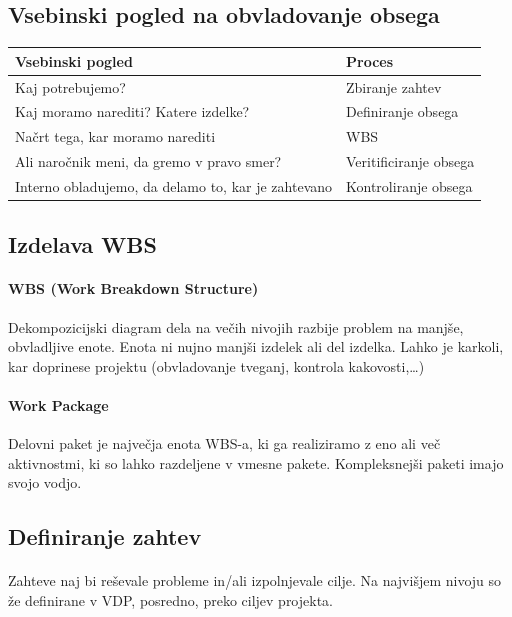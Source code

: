\documentclass[a4paper,12pt]{report}
\begin{document}
      \subsection{Vsebinski pogled na obvladovanje obsega}
         \begin{center}
            \begin{tabular}{|l|l|}
               \hline
               \textbf{Vsebinski pogled} & \textbf{Proces} \\
               \hline
               Kaj potrebujemo? & Zbiranje zahtev \\
               Kaj moramo narediti? Katere izdelke? & Definiranje obsega \\
               Načrt tega, kar moramo narediti & WBS \\
               Ali naročnik meni, da gremo v pravo smer? & Veritificiranje obsega \\
               Interno obladujemo, da delamo to, kar je zahtevano & Kontroliranje obsega\\
               \hline
            \end{tabular}
         \end{center}
      \subsection{Izdelava WBS}
         \paragraph{WBS (Work Breakdown Structure)} Dekompozicijski diagram dela na večih nivojih razbije problem na manjše, obvladljive enote. Enota ni nujno manjši izdelek ali del izdelka. Lahko je karkoli, kar doprinese projektu (obvladovanje tveganj, kontrola kakovosti,\dots)
         \paragraph{Work Package} Delovni paket je največja enota WBS-a, ki ga realiziramo z eno ali več aktivnostmi, ki so lahko razdeljene v vmesne pakete. Kompleksnejši paketi imajo svojo vodjo.

      \subsection{Definiranje zahtev}
         \paragraph{}Zahteve naj bi reševale probleme in/ali izpolnjevale cilje. Na najvišjem nivoju so že definirane v VDP, posredno, preko ciljev projekta.
\end{document}
